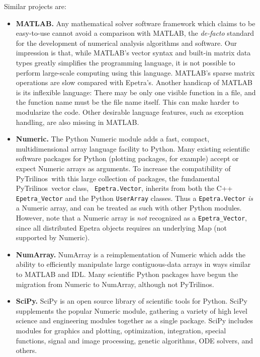 \documentclass[10pt,relax]{SANDreport}
\newcommand{\PyTrilinos}{{PyTrilinos}}
\begin{document}
Similar projects are:

\begin{itemize}

\item {\bf MATLAB.} Any mathematical solver software framework which
  claims to be easy-to-use cannot avoid a comparison with MATLAB, the
  {\sl de-facto} standard for the development of numerical analysis
  algorithms and software. Our impression is that, while MATLAB's
  vector syntax and built-in matrix data types greatly simplifies the
  programming language, it is not possible to perform large-scale
  computing using this language. MATLAB's sparse matrix operations are
  slow compared with Epetra's. Another handicap of MATLAB is its
  inflexible language: There may be only one visible function in a
  file, and the function name must be the file name itself. This can
  make harder to modularize the code.  Other desirable language
  features, such as exception handling, are also missing in MATLAB.

\item {\bf Numeric.} The Python Numeric module adds a fast, compact,
  multidimensional array language facility to Python.  Many existing
  scientific software packages for Python (plotting packages, for
  example) accept or expect Numeric arrays as arguments.  To increase
  the compatibility of \PyTrilinos\ with this large collection of
  packages, the fundamental \PyTrilinos\ vector class, {\tt
    Epetra.Vector}, inherits from both the C++ {\tt Epetra\_Vector}
  and the Python {\tt UserArray} classes.  Thus a {\tt Epetra.Vector}
  {\sl is} a Numeric array, and can be treated as such with other
  Python modules.  However, note that a Numeric array is {\sl not}
  recognized as a {\tt Epetra\_Vector}, since all distributed Epetra
  objects requires an underlying Map (not supported by Numeric).

\item {\bf NumArray.}  NumArray is a reimplementation of Numeric which
  adds the ability to efficiently manipulate large contiguous-data
  arrays in ways similar to MATLAB and IDL.  Many scientific Python
  packages have begun the migration from Numeric to NumArray, although
  not \PyTrilinos.

\item {\bf SciPy.} SciPy is an open source library of scientific tools
  for Python. SciPy supplements the popular Numeric module, gathering
  a variety of high level science and engineering modules together as
  a single package. SciPy includes modules for graphics and plotting,
  optimization, integration, special functions, signal and image
  processing, genetic algorithms, ODE solvers, and others.


\end{itemize}
\end{document}
